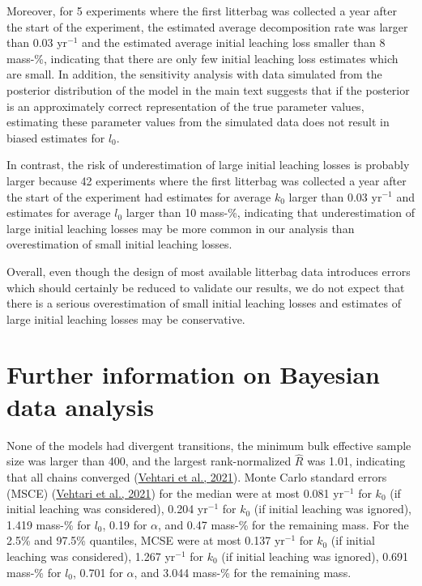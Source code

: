 \documentclass[
  12pt,
]{article}
\begin{document}
Moreover, for 5 experiments where the first litterbag was collected a year after the start of the experiment, the estimated average decomposition rate was larger than 0.03 yr\(^{-1}\) and the estimated average initial leaching loss smaller than 8 mass-\%, indicating that there are only few initial leaching loss estimates which are small. In addition, the sensitivity analysis with data simulated from the posterior distribution of the model in the main text suggests that if the posterior is an approximately correct representation of the true parameter values, estimating these parameter values from the simulated data does not result in biased estimates for \(l_0\).

In contrast, the risk of underestimation of large initial leaching losses is probably larger because 42 experiments where the first litterbag was collected a year after the start of the experiment had estimates for average \(k_0\) larger than 0.03 yr\(^{-1}\) and estimates for average \(l_0\) larger than 10 mass-\%, indicating that underestimation of large initial leaching losses may be more common in our analysis than overestimation of small initial leaching losses.

Overall, even though the design of most available litterbag data introduces errors which should certainly be reduced to validate our results, we do not expect that there is a serious overestimation of small initial leaching losses and estimates of large initial leaching losses may be conservative.

\hypertarget{sup-14}{%
\section{Further information on Bayesian data analysis}\label{sup-14}}

None of the models had divergent transitions, the minimum bulk effective sample size was larger than 400, and the largest rank-normalized \(\hat{R}\) was 1.01, indicating that all chains converged (\protect\hyperlink{ref-Vehtari.2021}{Vehtari et al., 2021}). Monte Carlo standard errors (MSCE) (\protect\hyperlink{ref-Vehtari.2021}{Vehtari et al., 2021}) for the median were at most 0.081 yr\(^{-1}\) for \(k_0\) (if initial leaching was considered), 0.204 yr\(^{-1}\) for \(k_0\) (if initial leaching was ignored), 1.419 mass-\% for \(l_0\), 0.19 for \(\alpha\), and 0.47 mass-\% for the remaining mass. For the 2.5\% and 97.5\% quantiles, MCSE were at most 0.137 yr\(^{-1}\) for \(k_0\) (if initial leaching was considered), 1.267 yr\(^{-1}\) for \(k_0\) (if initial leaching was ignored), 0.691 mass-\% for \(l_0\), 0.701 for \(\alpha\), and 3.044 mass-\% for the remaining mass.
\end{document}
